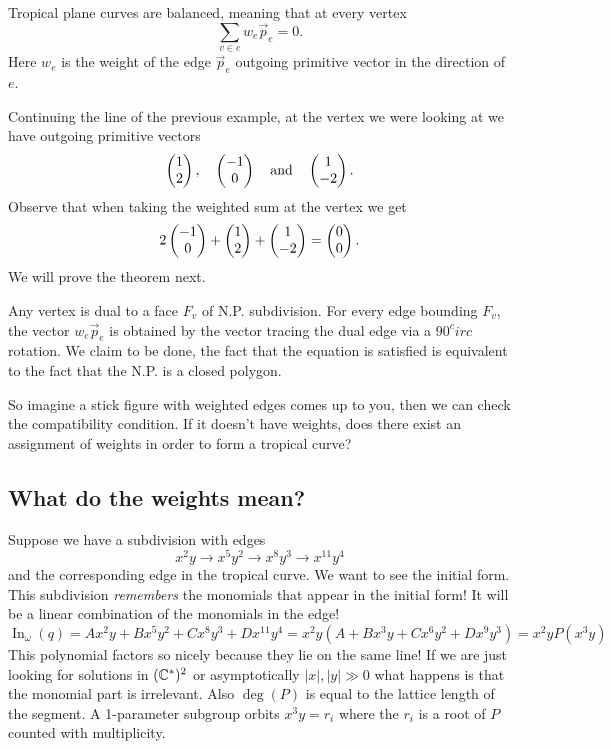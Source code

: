 \documentclass[12pt]{memoir}
\theoremstyle{definition}
\begin{document}
\begin{Th}
Tropical plane curves are balanced, meaning that at every vertex
$$\sum_{v\in e}w_e\vec p_e=0.$$
Here $w_e$ is the weight of the edge $\vec p_e$ outgoing primitive vector in the direction of $e$.
\end{Th}

Continuing the line of the previous example, at the vertex we were looking at we have outgoing primitive vectors 
$$\begin{pmatrix} 1 \\ 2 \end{pmatrix},\quad\begin{pmatrix} -1 \\ 0 \end{pmatrix}\quad\text{and}\quad\begin{pmatrix} 1 \\ -2 \end{pmatrix}.$$
Observe that when taking the weighted sum at the vertex we get 
$$2\begin{pmatrix} -1 \\ 0 \end{pmatrix}+\begin{pmatrix} 1 \\ 2 \end{pmatrix}+\begin{pmatrix} 1 \\ -2 \end{pmatrix}=\begin{pmatrix} 0 \\ 0 \end{pmatrix}.$$
We will prove the theorem next.

\begin{ptcbp}
Any vertex is dual to a face $F_v$ of N.P. subdivision.
For every edge bounding $F_v$, the vector $w_e\vec p_e$ is obtained by the vector tracing the dual edge via a $90^circ$ rotation. We claim to be done, the fact that the equation is satisfied is equivalent to the fact that the N.P. is a closed polygon.
\end{ptcbp}

So imagine a stick figure with weighted edges comes up to you, then we can check the compatibility condition. If it doesn't have weights, does there exist an assignment of weights in order to form a tropical curve? 

\subsection{What do the weights mean?}

\begin{Ex}
    Suppose we have a subdivision with edges 
    $$x^2y\to x^5y^2\to x^8y^3\to x^11y^4$$
    and the corresponding edge in the tropical curve. We want to see the initial form. This subdivision \emph{remembers} the monomials that appear in the initial form! It will be a linear combination of the monomials in the edge!
    $$\operatorname{In}_\omega(q)=Ax^2y+Bx^5y^2+Cx^8y^3+Dx^{11}y^4=x^2y(A+Bx^3y+Cx^6y^2+Dx^9y^3)=x^2yP(x^3y)$$
    This polynomial factors so nicely because they lie on the same line! If we are just looking for solutions in $(\mathbb{C}^\ast)^2$ or asymptotically $|x|,|y|\gg 0$ what happens is that the monomial part is irrelevant. Also $\deg(P)$ is equal to the lattice length of the segment. A 1-parameter subgroup orbits $x^3y=r_i$ where the $r_i$ is a root of $P$ counted with multiplicity.    
\end{Ex}
\end{document}
